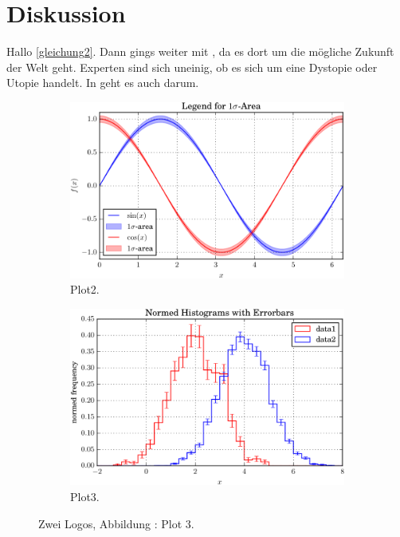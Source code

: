 \section{Diskussion}
Hallo \eqref{gleichung2}. Dann gings weiter mit \cite{buch}, da es dort um die mögliche Zukunft der Welt geht. Experten sind sich
uneinig, ob es sich um eine Dystopie oder Utopie handelt. In \cite{kent} geht es auch darum.
\begin{figure}
  \centering
  \begin{subfigure}{0.48\textwidth}
    \centering
    \includegraphics[width=\textwidth]{plot2.pdf}
    \caption{Plot2.}
    \label{fig:plot2}
  \end{subfigure}
    \begin{subfigure}{0.48\textwidth}
      \centering
      \includegraphics[width=\textwidth]{plot3.pdf}
      \caption{Plot3.}
      \label{fig:plot3}
  \end{subfigure}
  \caption{Zwei Logos, Abbildung : Plot 3.}
  \label{fig:2plots}
\end{figure}
\newpage
\nocite{*}
\printbibliography
